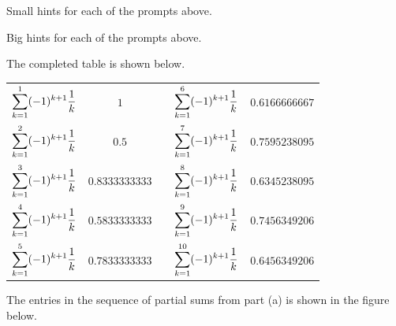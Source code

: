 \begin{smallhint}
\ba
	\item Small hints for each of the prompts above.
\ea
\end{smallhint}
\begin{bighint}
\ba
	\item Big hints for each of the prompts above.
\ea
\end{bighint}
\begin{activitySolution}
\ba
	\item The completed table is shown below.
\begin{center}
\renewcommand{\arraystretch}{1.5}
\begin{tabular}{c|c p{0.25in} c|c} \\
$\displaystyle \sum_{k=1}^{1} (-1)^{k+1}\frac{1}{k}$   & $1$ 				&	&$\displaystyle \sum_{k=1}^{6} (-1)^{k+1}\frac{1}{k}$   & $0.6166666667$ \\
$\displaystyle \sum_{k=1}^{2} (-1)^{k+1}\frac{1}{k}$   & $0.5$ 			&	&$\displaystyle \sum_{k=1}^{7} (-1)^{k+1}\frac{1}{k}$   & $0.7595238095$ \\
$\displaystyle \sum_{k=1}^{3} (-1)^{k+1}\frac{1}{k}$   & $0.8333333333$ 	&	&$\displaystyle \sum_{k=1}^{8} (-1)^{k+1}\frac{1}{k}$   & $0.6345238095$ \\
$\displaystyle \sum_{k=1}^{4} (-1)^{k+1}\frac{1}{k}$   & $0.5833333333$ 	&	&$\displaystyle \sum_{k=1}^{9} (-1)^{k+1}\frac{1}{k}$   & $0.7456349206$ \\
$\displaystyle \sum_{k=1}^{5} (-1)^{k+1}\frac{1}{k}$   & $0.7833333333$ 	&	&$\displaystyle \sum_{k=1}^{10} (-1)^{k+1}\frac{1}{k}$  & $0.6456349206$ \\
\end{tabular}
\end{center}
    \item The entries in the sequence of partial sums from part (a) is shown in the figure below.
\begin{center}

\end{center}
\end{activitySolution}
